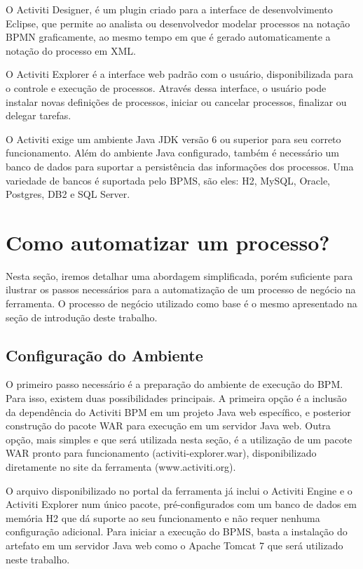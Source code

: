 O Activiti Designer, é um plugin criado para a interface de desenvolvimento Eclipse, que permite ao analista ou desenvolvedor modelar processos na notação BPMN graficamente, ao mesmo tempo em que é gerado automaticamente a notação do processo em XML.

O Activiti Explorer é a interface web padrão com o usuário, disponibilizada para o controle e execução de processos. Através dessa interface, o usuário pode instalar novas definições de processos, iniciar ou cancelar processos, finalizar ou delegar tarefas.

O Activiti exige um ambiente Java JDK versão 6 ou superior para seu correto funcionamento. Além do ambiente Java configurado, também é necessário um banco de dados para suportar a persistência das informações dos processos. Uma variedade de bancos é suportada pelo BPMS, são eles: H2, MySQL, Oracle, Postgres, DB2 e SQL Server.

\section{Como automatizar um processo?}\label{sec:activiti-automatizar_processo}

Nesta seção, iremos detalhar uma abordagem simplificada, porém suficiente para ilustrar os passos necessários para a automatização de um processo de negócio na ferramenta.  O processo de negócio utilizado como base é o mesmo apresentado na seção de introdução deste trabalho.

\subsection{Configuração do Ambiente}\label{sec:activiti-automatizar_processo_configuracao_ambiente}

O primeiro passo necessário é a preparação do ambiente de execução do BPM. Para isso, existem duas possibilidades principais. A primeira opção é a inclusão da dependência do Activiti BPM em um projeto Java web específico, e posterior construção do pacote WAR para execução em um servidor Java web. Outra opção, mais simples e que será utilizada nesta seção, é a utilização de um pacote WAR pronto para funcionamento (activiti-explorer.war), disponibilizado diretamente no site da ferramenta (www.activiti.org).

O arquivo disponibilizado no portal da ferramenta já inclui o Activiti Engine e o Activiti Explorer num único pacote, pré-configurados com um banco de dados em memória H2 que dá suporte ao seu funcionamento e não requer nenhuma configuração adicional. Para iniciar a execução do BPMS, basta a instalação do artefato em um servidor Java web como o Apache Tomcat 7 que será utilizado neste trabalho.

